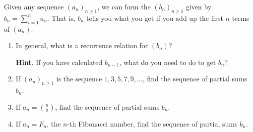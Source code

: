\documentclass{book}
\begin{document}
\setcounter{cpjt}{145}
\addtocounter{cpjt}{-1}
\begin{activity}\label{activity-138}
\hypertarget{p-929}{}%
Given any sequence \((a_n)_{n \ge 1}\), we can form the  \((b_n)_{n \ge 1}\) given by \(b_n = \sum_{i = 1}^n a_n\).  That is, \(b_n\) tells you what you get if you add up the first \(n\) terms of \((a_n)\).%
\begin{enumerate}[font=\bfseries,label=(\alph*),ref=\alph*]
\item\label{task-173} \hypertarget{p-930}{}%
In general, what is a recurrence relation for \((b_n)\)?%
\par\smallskip%
\noindent\textbf{Hint}.\hypertarget{hint-104}{}\quad%
\hypertarget{p-931}{}%
If you have calculated \(b_{n-1}\), what do you need to do to get \(b_n\)?%
\item\label{task-174} \hypertarget{p-932}{}%
If \((a_n)_{n \ge 1}\) is the sequence \(1, 3, 5, 7, 9, \ldots\), find the sequence of partial sums \(b_n\).%
\item\label{task-175} \hypertarget{p-933}{}%
If \(a_n = \binom{n}{2}\), find the sequence of partial sums \(b_n\).%
\item\label{task-176} \hypertarget{p-934}{}%
If \(a_n = F_n\), the \(n\)-th Fibonacci number, find the sequence of partial sums \(b_n\).%
\end{enumerate}
\end{activity}

\clearpage
\end{document}
